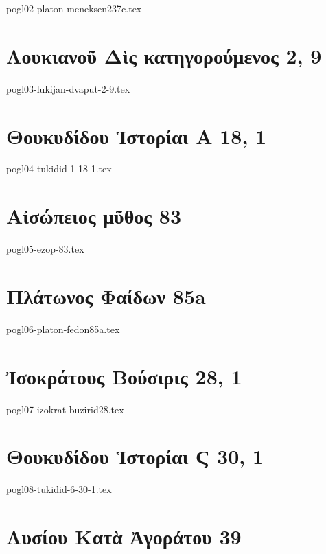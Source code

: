 \documentclass[a4paper,12pt,twoside]{report}
\begin{document}
{pogl02-platon-meneksen237c.tex}

\chapter[Λουκιανοῦ Δὶς κατηγορούμενος ]{\textgreek[variant=ancient]{Λουκιανοῦ Δὶς κατηγορούμενος } 2, 9}

{pogl03-lukijan-dvaput-2-9.tex}


\chapter[Θουκυδίδου Ἱστορίαι Α]{\textgreek[variant=ancient]{Θουκυδίδου Ἱστορίαι Α} 18, 1}

{pogl04-tukidid-1-18-1.tex}


\chapter[Αἰσώπειος μῦθος 83]{\textgreek[variant=ancient]{Αἰσώπειος μῦθος} 83}

{pogl05-ezop-83.tex}

\chapter[Πλάτωνος Φαίδων]{\textgreek[variant=ancient]{Πλάτωνος Φαίδων} 85a}

{pogl06-platon-fedon85a.tex}

\chapter[Ἰσοκράτους Βούσιρις]{\textgreek[variant=ancient]{Ἰσοκράτους Βούσιρις} 28, 1}

{pogl07-izokrat-buzirid28.tex}

\chapter[Θουκυδίδου Ἱστορίαι Ϛ]{\textgreek[variant=ancient]{Θουκυδίδου Ἱστορίαι Ϛ} 30, 1}

{pogl08-tukidid-6-30-1.tex}

\chapter[Λυσίου Κατὰ Ἀγοράτου]{\textgreek[variant=ancient]{Λυσίου Κατὰ Ἀγοράτου} 39}
\end{document}
